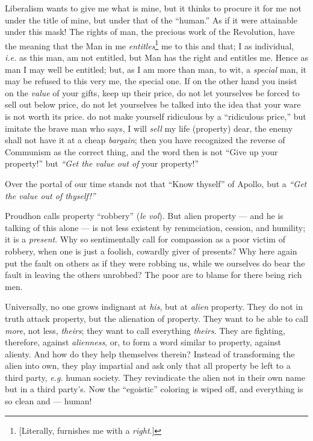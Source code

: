 Liberalism wants to give me what is mine, but it thinks to procure it for me 
not under the title of mine, but under that of the ``human.'' As if it were 
attainable under this mask! The rights of man, the precious work of the 
Revolution, have the meaning that the Man in me 
\textit{entitles}\footnote{[Literally, furnishes me with a \textit{right}.]} 
me to this and that; I as individual, \textit{i.e.} as this man, am not 
entitled, but Man has the right and entitles me. Hence as man I may well be 
entitled; but, as I am more than man, to wit, a \textit{special} man, it may 
be refused to this very me, the special one. If on the other hand you insist 
on the \textit{value} of your gifts, keep up their price, do not let 
yourselves be forced to sell out below price, do not let yourselves be talked 
into the idea that your ware is not worth its price. do not make yourself 
ridiculous by a ``ridiculous price,'' but imitate the brave man who says, I 
will \textit{sell} my life (property) dear, the enemy shall not have it at a 
cheap \textit{bargain}; then you have recognized the reverse of Communism as 
the correct thing, and the word then is not ``Give up your property!'' but 
\textit{``Get the value out of} your property!''

Over the portal of our time stands not that ``Know thyself'' of Apollo, but 
a \textit{``Get the value out of thyself!''}

Proudhon calls property ``robbery'' (\textit{le vol}). But alien property --- and he is talking of this alone --- is not less existent by renunciation, 
cession, and humility; it is a \textit{present}. Why so sentimentally call for 
compassion as a poor victim of robbery, when one is just a foolish, cowardly 
giver of presents? Why here again put the fault on others as if they were 
robbing us, while we ourselves do bear the fault in leaving the others 
unrobbed? The poor are to blame for there being rich men.

Universally, no one grows indignant at \textit{his}, but at \textit{alien} 
property. They do not in truth attack property, but the alienation of 
property. They want to be able to call \textit{more}, not less, 
\textit{theirs}; they want to call everything \textit{theirs}. They are 
fighting, therefore, against \textit{alienness}, or, to form a word similar to 
property, against alienty. And how do they help themselves therein? Instead of 
transforming the alien into own, they play impartial and ask only that all 
property be left to a third party, \textit{e.g.} human society. They 
revindicate the alien not in their own name but in a third party's. Now the 
``egoistic'' coloring is wiped off, and everything is so clean and --- human!

